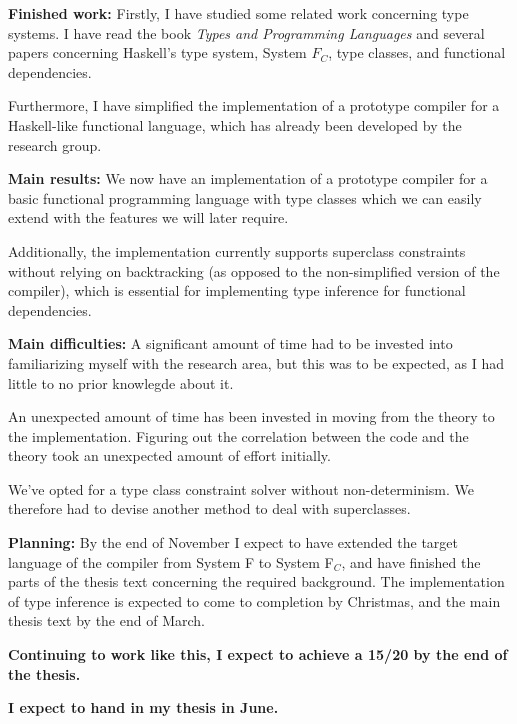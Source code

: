 \documentclass[12pt]{report}
\begin{document}
\vspace{1cm}
{\bf Finished work:}
Firstly, I have studied some related work concerning type systems. I have read
the book \textit{Types and Programming Languages} and several papers concerning
Haskell's type system, System $F_C$, type classes, and functional dependencies.

Furthermore, I have simplified the implementation of a prototype compiler for a
Haskell-like functional language, which has already been developed by the
research group.


\vspace{1cm}
{\bf Main results:}
We now have an implementation of a prototype compiler for a basic functional
programming language with type classes which we can easily extend with the
features we will later require.

Additionally, the implementation currently supports superclass constraints
without relying on backtracking (as opposed to the non-simplified version of
the compiler), which is essential for implementing type inference for
functional dependencies.

\vspace{1cm}
{\bf Main difficulties:}
A significant amount of time had to be invested into familiarizing myself with
the research area, but this was to be expected, as I had little to no prior
knowlegde about it.

An unexpected amount of time has been invested in moving from the theory to the
implementation. Figuring out the correlation between the code and the theory
took an unexpected amount of effort initially.

We've opted for a type class constraint solver without non-determinism. We
therefore had to devise another method to deal with superclasses.

\vspace{1cm}
{\bf Planning:}
By the end of November I expect to have extended the target language of the
compiler from System F to System F$_C$, and have finished the parts of the
thesis text concerning the required background. The implementation of type
inference is expected to come to completion by Christmas, and the main thesis
text by the end of March.

\vspace{1cm}
{\bf Continuing to work like this, I expect to achieve a 15/20 by the end of the
thesis.}

{\bf I expect to hand in my thesis in June.}
\end{document}
